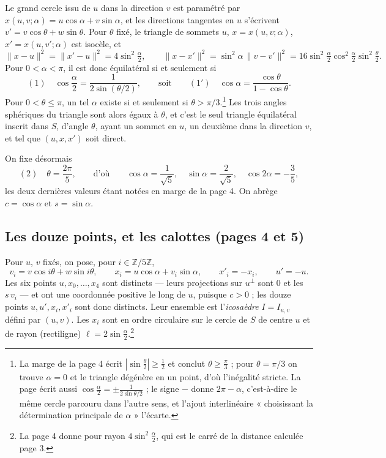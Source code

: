 \documentclass[11pt,a4paper]{article}
\begin{document}
Le grand cercle issu de $u$ dans la direction $v$ est paramétré par
$x(u,v;\alpha) = u\cos\alpha + v\sin\alpha$, et les directions tangentes en
$u$ s'écrivent $v' = v\cos\theta + w\sin\theta$. Pour $\theta$ fixé, le
triangle de sommets $u$, $x = x(u,v;\alpha)$, $x' = x(u,v';\alpha)$ est
isocèle, et
\[
\|x - u\|^{2} = \|x' - u\|^{2} = 4\sin^{2}\tfrac{\alpha}{2},
\qquad
\|x - x'\|^{2} = \sin^{2}\alpha\,\|v - v'\|^{2}
= 16\sin^{2}\tfrac{\alpha}{2}\cos^{2}\tfrac{\alpha}{2}\sin^{2}\tfrac{\theta}{2}.
\]
Pour $0 < \alpha < \pi$, il est donc équilatéral si et seulement si
\[
(1)\quad \cos\frac{\alpha}{2} = \frac{1}{2\sin(\theta/2)},
\qquad\text{soit}\qquad
(1')\quad \cos\alpha = \frac{\cos\theta}{1 - \cos\theta}.
\]
Pour $0 < \theta \leqslant \pi$, un tel $\alpha$ existe si et seulement si
$\theta > \pi/3$.\footnote{La marge de la page 4 écrit
$|\sin\frac{\theta}{2}| \geqslant \frac12$ et conclut
$\theta \geqslant \frac{\pi}{3}$ ; pour $\theta = \pi/3$ on trouve $\alpha = 0$
et le triangle dégénère en un point, d'où l'inégalité stricte. La page écrit
aussi $\cos\frac{\alpha}{2} = \pm\frac{1}{2\sin\theta/2}$ ; le signe $-$ donne
$2\pi - \alpha$, c'est-à-dire le même cercle parcouru dans l'autre sens, et
l'ajout interlinéaire « choisissant la détermination principale de $\alpha$ »
l'écarte.} Les trois angles sphériques du triangle sont alors égaux à
$\theta$, et c'est le seul triangle équilatéral inscrit dans $S$, d'angle
$\theta$, ayant un sommet en $u$, un deuxième dans la direction $v$, et tel
que $(u, x, x')$ soit direct.

On fixe désormais
\[
(2)\quad \theta = \frac{2\pi}{5},
\qquad\text{d'où}\qquad
\cos\alpha = \frac{1}{\sqrt{5}},\quad \sin\alpha = \frac{2}{\sqrt{5}},\quad \cos 2\alpha = -\frac{3}{5},
\]
les deux dernières valeurs étant notées en marge de la page 4. On abrège
$c = \cos\alpha$ et $s = \sin\alpha$.

\subsection*{Les douze points, et les calottes (pages 4 et 5)}

Pour $u$, $v$ fixés, on pose, pour $i \in \mathbb{Z}/5\mathbb{Z}$,
\[
v_i = v\cos i\theta + w\sin i\theta,\qquad
x_i = u\cos\alpha + v_i\sin\alpha,\qquad
x'_i = -x_i,\qquad u' = -u .
\]
Les six points $u, x_0, \ldots, x_4$ sont distincts --- leurs projections sur
$u^{\perp}$ sont $0$ et les $s\,v_i$ --- et ont une coordonnée positive le
long de $u$, puisque $c > 0$ ; les douze points $u, u', x_i, x'_i$ sont donc
distincts. Leur ensemble est l'\emph{icosaèdre} $I = I_{u,v}$ défini par
$(u,v)$. Les $x_i$ sont en ordre circulaire sur le cercle de $S$ de centre $u$
et de rayon (rectiligne) $\ell = 2\sin\frac{\alpha}{2}$.\footnote{La page 4
donne pour rayon $4\sin^{2}\frac{\alpha}{2}$, qui est le carré de la distance
calculée page 3.}
\end{document}

